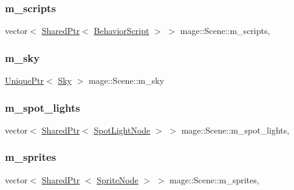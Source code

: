 \hypertarget{classmage_1_1_scene_a84548bf6978f8955ce5892cb23536a4e}{}\label{classmage_1_1_scene_a84548bf6978f8955ce5892cb23536a4e} 
\subsubsection{\texorpdfstring{m\+\_\+scripts}{m\_scripts}}
{\footnotesize\ttfamily vector$<$ \hyperlink{namespacemage_a1e01ae66713838a7a67d30e44c67703e}{Shared\+Ptr}$<$ \hyperlink{classmage_1_1_behavior_script}{Behavior\+Script} $>$ $>$ mage\+::\+Scene\+::m\+\_\+scripts\hspace{0.3cm}{\ttfamily [mutable]}, {\ttfamily [private]}}

\hypertarget{classmage_1_1_scene_a90163a34ed39216b14175c4b799abd46}{}\label{classmage_1_1_scene_a90163a34ed39216b14175c4b799abd46} 
\subsubsection{\texorpdfstring{m\+\_\+sky}{m\_sky}}
{\footnotesize\ttfamily \hyperlink{namespacemage_a3316d7143a973e37adf1110f2e80ca31}{Unique\+Ptr}$<$ \hyperlink{classmage_1_1_sky}{Sky} $>$ mage\+::\+Scene\+::m\+\_\+sky\hspace{0.3cm}{\ttfamily [private]}}

\hypertarget{classmage_1_1_scene_a4e1954bc0b812d6a71123ca3ac9eeb75}{}\label{classmage_1_1_scene_a4e1954bc0b812d6a71123ca3ac9eeb75} 
\subsubsection{\texorpdfstring{m\+\_\+spot\+\_\+lights}{m\_spot\_lights}}
{\footnotesize\ttfamily vector$<$ \hyperlink{namespacemage_a1e01ae66713838a7a67d30e44c67703e}{Shared\+Ptr}$<$ \hyperlink{namespacemage_aeed5dee4ff6c591eabb0e9114256df4a}{Spot\+Light\+Node} $>$ $>$ mage\+::\+Scene\+::m\+\_\+spot\+\_\+lights\hspace{0.3cm}{\ttfamily [mutable]}, {\ttfamily [private]}}

\hypertarget{classmage_1_1_scene_a2d68edf08b57dde36ec7cf1f5a91d281}{}\label{classmage_1_1_scene_a2d68edf08b57dde36ec7cf1f5a91d281} 
\subsubsection{\texorpdfstring{m\+\_\+sprites}{m\_sprites}}
{\footnotesize\ttfamily vector$<$ \hyperlink{namespacemage_a1e01ae66713838a7a67d30e44c67703e}{Shared\+Ptr} $<$ \hyperlink{classmage_1_1_sprite_node}{Sprite\+Node} $>$ $>$ mage\+::\+Scene\+::m\+\_\+sprites\hspace{0.3cm}{\ttfamily [mutable]}, {\ttfamily [private]}}

